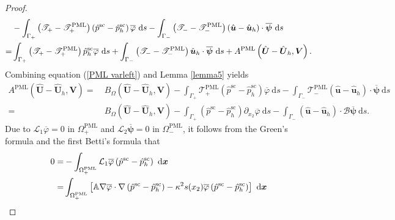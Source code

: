 \documentclass[final,3p,times]{elsarticle}
\begin{document}
\begin{proof}
\begin{align}
		&-\int_{\Gamma_+}\left(\mathscr{T}_+-\mathscr{T}_+^{\mathrm{PML}}\right)\left(\hat{p}^{\mathrm{sc}}-\hat{p}^{\mathrm{sc}}_h\right) \overline{\varphi} \mathrm{~d} s
		-\int_{\Gamma_-}\left(\mathscr{T}_--\mathscr{T}_-^{\mathrm{PML}}\right)\left(\hat{\boldsymbol{u}}-\hat{\boldsymbol{u}}_h\right) \cdot \overline{\boldsymbol{\psi}} \mathrm{~d} s \notag\\
		=&\int_{\Gamma_+}\left(\mathscr{T}_+-\mathscr{T}_+^{\mathrm{PML}}\right)\hat{p}^{\mathrm{sc}}_h \overline{\varphi} \mathrm{~d} s
		+\int_{\Gamma_-}\left(\mathscr{T}_--\mathscr{T}_-^{\mathrm{PML}}\right)\hat{\boldsymbol{u}}_h \cdot \overline{\boldsymbol{\psi}} \mathrm{~d} s +A^{\mathrm{PML}}\left(\hat{\boldsymbol{U}}-\hat{\boldsymbol{U}}_h, \boldsymbol{V}\right).\label{4.2.1}
	\end{align}
	Combining equation (\ref{PML varleft}) and Lemma \ref{lemma5} yields
	\begin{align*}
		A^{\mathrm{PML}}\left(\hat{\boldsymbol{U}}-\hat{\boldsymbol{U}}_h,\boldsymbol{V}\right)
		=&~B_{\Omega}\left(\hat{\boldsymbol{U}}-\hat{\boldsymbol{U}}_h, \boldsymbol{V}\right) -\int_{\Gamma_+}\mathscr{T}_+^{\mathrm{PML}}\left(\hat{p}^{\mathrm{sc}}-\hat{p}^{\mathrm{sc}}_h\right) \overline{\varphi} \mathrm{~d} s
		-\int_{\Gamma_-}\mathscr{T}_-^{\mathrm{PML}}\left(\hat{\boldsymbol{u}}-\hat{\boldsymbol{u}}_h\right) \cdot \overline{\boldsymbol{\psi}} \mathrm{~d} s\\
		=&~B_{\Omega}\left(\hat{\boldsymbol{U}}-\hat{\boldsymbol{U}}_h, \boldsymbol{V}\right) 
		- \int_{\Gamma_+}\left(\hat{p}^{\mathrm{sc}}-\hat{p}^{\mathrm{sc}}_h\right) \partial_{x_2} \overline{\varphi} \mathrm{~d} s
		- \int_{\Gamma_-} \left(\hat{\boldsymbol{u}}-\hat{\boldsymbol{u}}_h\right) \cdot \mathscr{B} \overline{\boldsymbol{\psi}} \mathrm{~d} s.
	\end{align*}
	Due to $\mathcal{L}_1 \overline{\varphi}=0$ in $\Omega^{\mathrm{PML}}_+$ and $\mathcal{L}_2 \overline{\boldsymbol{\psi}}=0$ in $\Omega^{\mathrm{PML}}_-$, it follows from the Green's formula and the first Betti's formula that
	\begin{align*}
		0 =& -\int_{\Omega^{\mathrm{PML}}_+}	\mathcal{L}_1\overline{\varphi}\left(\hat{p}^{\mathrm{sc}}-\hat{p}^{\mathrm{sc}}_h\right) \mathrm{~d} \boldsymbol{x} \notag\\
		=& \int_{\Omega^{\mathrm{PML}}_+}\left[\mathbb{A}\nabla \overline{\varphi} \cdot \nabla  \left(\hat{p}^{\mathrm{sc}}-\hat{p}^{\mathrm{sc}}_h\right)   
		- \kappa^2 s(x_2) \overline{\varphi}\left(\hat{p}^{\mathrm{sc}}-\hat{p}^{\mathrm{sc}}_h\right)\right] \mathrm{~d} \boldsymbol{x} 

\end{align*}
\end{proof}
\end{document}
